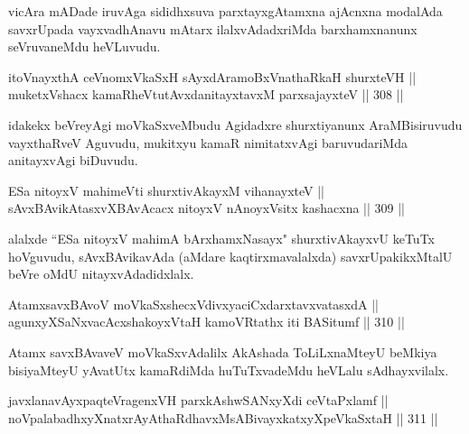 \begin{artha}
vicAra mADade iruvAga sididhxsuva parxtayxgAtamxna ajAcnxna
modalAda savxrUpada vayxvadhAnavu mAtarx ilalxvAdadxriMda
barxhamxnanunx seVruvaneMdu heVLuvudu.
\end{artha}


\begin{shl}
itoV\s nayxthA ceVnomxVkaSxH sAyxdAramoBxV\s nathaRkaH shurxteVH || \\
muketxVshacx kamaRheVtutAvxdanitayxtavxM parxsajayxteV \hfill || 308 || 
\end{shl}

\begin{artha}
idakekx beVreyAgi moVkaSxveMbudu Agidadxre shurxtiyanunx
AraMBisiruvudu vayxthaRveV Aguvudu, mukitxyu kamaR nimitatxvAgi
baruvudariMda anitayxvAgi biDuvudu.
\end{artha}

\begin{shl}
ESa nitoyxV mahimeVti shurxtivAkayxM vihanayxteV || \\
sAvxBAvikAtasxvXBAvAcacx nitoyxV nAnoyxV\s sitx kashacxna \hfill || 309 ||  
\end{shl}

\begin{artha}
alalxde ``ESa nitoyxV mahimA bArxhamxNasayx" shurxtivAkayxvU keTuTx
hoVguvudu, sAvxBAvikavAda (aMdare kaqtirxmavalalxda) savxrUpakikxMtalU
beVre oMdU nitayxvAdadidxlalx.
\end{artha}


\begin{shl}
AtamxsavxBAvoV moVkaSxshecxVdivxyaciCxdarxtavxvatasxdA || \\
agunxyXSaNxvacAcxshakoyxV\s taH kamoVRtathx iti BASitumf \hfill || 310 ||  
\end{shl}

\begin{artha}
Atamx savxBAvaveV moVkaSxvAdalilx AkAshada ToLiLxnaMteyU beMkiya
bisiyaMteyU yAvatUtx kamaRdiMda huTuTxvadeMdu heVLalu sAdhayxvilalx.
\end{artha}


\begin{shl}
\footnotemark[1]javxlanavAyxpaqteVragenxVH parxkAshwSANxyXdi ceVtaPxlamf || \\
noVpalabadhxyXnatxrAyAthaRdhavxMsABivayxkatxyXpeVkaSxtaH \hfill || 311 ||  
\end{shl}

